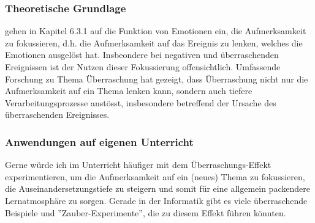 \begin{myExBox}[title=Emotionen zur Fokussierung von Aufmerksamkeit]
\subsubsection*{Theoretische Grundlage}
\textcite{alma99116838938605511} gehen in Kapitel 6.3.1 auf die Funktion von Emotionen ein, die Aufmerksamkeit zu fokussieren, d.h. die Aufmerksamkeit auf das Ereignis zu lenken, welches die Emotionen ausgelöst hat. Insbeondere bei negativen und überraschenden Ereignissen ist der Nutzen dieser Fokussierung offensichtlich. Umfassende Forschung zu Thema Überraschung hat gezeigt, dass Überraschung nicht nur die Aufmerksamkeit auf ein Thema lenken kann, sondern auch tiefere Verarbeitungsprozesse anstösst, insbesondere betreffend der Ursache des überraschenden Ereignisses.

\subsubsection*{Anwendungen auf eigenen Unterricht}
Gerne würde ich im Unterricht häufiger mit dem Überraschungs-Effekt experimentieren, um die Aufmerksamkeit auf ein (neues) Thema zu fokussieren, die Auseinandersetzungstiefe zu steigern und somit für eine allgemein packendere Lernatmosphäre zu sorgen. Gerade in der Informatik gibt es viele überraschende Beispiele und ''Zauber-Experimente'', die zu diesem Effekt führen könnten.
\end{myExBox}

